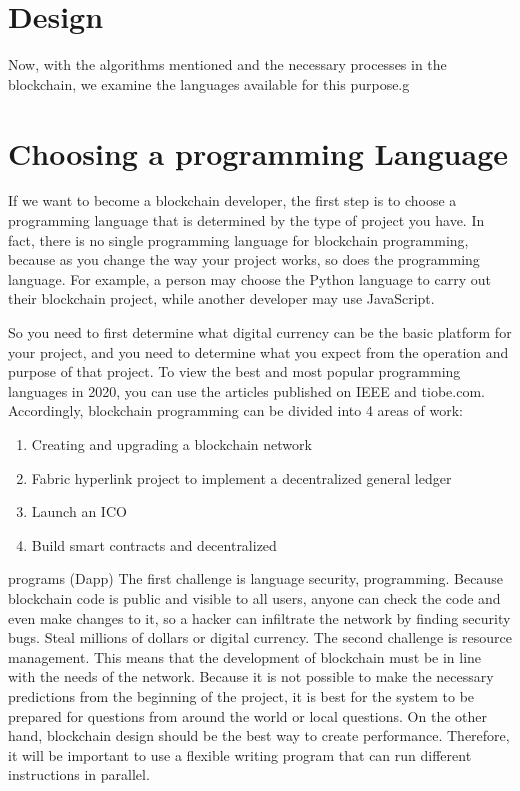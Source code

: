 \begin{flushleft}
\section{Design}
Now, with the algorithms mentioned and the necessary processes in the blockchain, we examine the languages available for this purpose.g


\section{Choosing a programming Language}
If we want to become a blockchain developer, the first step is to choose a programming language that is determined by the type of project you have. In fact, there is no single programming language for blockchain programming, because as you change the way your project works, so does the programming language. For example, a person may choose the Python language to carry out their blockchain project, while another developer may use JavaScript.

So you need to first determine what digital currency can be the basic platform for your project, and you need to determine what you expect from the operation and purpose of that project. To view the best and most popular programming languages in 2020, you can use the articles published on IEEE and tiobe.com.
Accordingly, blockchain programming can be divided into 4 areas of work:
\begin{enumerate}
\item Creating and upgrading a blockchain network
\item Fabric hyperlink project to implement a decentralized general ledger
\item Launch an ICO
\item Build smart contracts and decentralized 
\end{enumerate}
programs (Dapp)
The first challenge is language security, programming. Because blockchain code is public and visible to all users, anyone can check the code and even make changes to it, so a hacker can infiltrate the network by finding security bugs. Steal millions of dollars or digital currency.
The second challenge is resource management. This means that the development of blockchain must be in line with the needs of the network. Because it is not possible to make the necessary predictions from the beginning of the project, it is best for the system to be prepared for questions from around the world or local questions. On the other hand, blockchain design should be the best way to create performance. Therefore, it will be important to use a flexible writing program that can run different instructions in parallel.


\end{flushleft}
